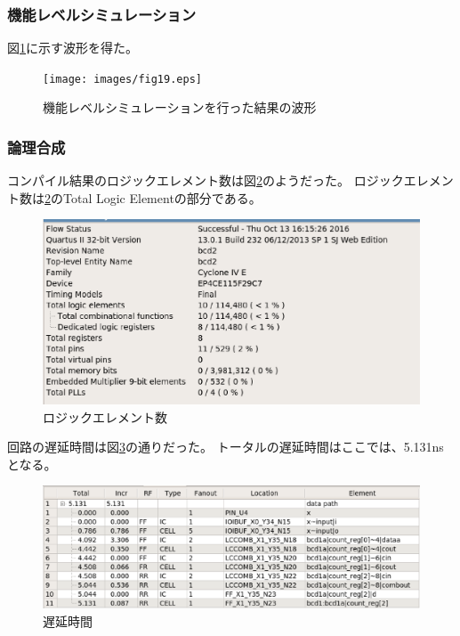 \documentclass[uplatex]{jsarticle}
\begin{document}
\subsubsection{機能レベルシミュレーション}

図\ref{fig:19}に示す波形を得た。

\begin{figure}[htb]
  \begin{center}
    \texttt{[image: images/fig19.eps]}
    \caption{機能レベルシミュレーションを行った結果の波形}
    \label{fig:19}
  \end{center}
\end{figure}

\subsubsection{論理合成}


コンパイル結果のロジックエレメント数は図\ref{fig:20}のようだった。
ロジックエレメント数は\ref{fig:20}のTotal Logic Elementの部分である。  

\begin{figure}[htb]
  \begin{center}
    \includegraphics[width=13cm]{images/fig20.eps}
    \caption{ロジックエレメント数}
    \label{fig:20}
  \end{center}
\end{figure}

回路の遅延時間は図\ref{fig:21}の通りだった。
トータルの遅延時間はここでは、5.131nsとなる。

\begin{figure}[htb]
  \begin{center}
    \includegraphics[width=13cm]{images/fig21.eps}
    \caption{遅延時間}
    \label{fig:21}
  \end{center}
\end{figure}
\end{document}
